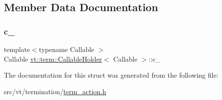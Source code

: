 \subsection{Member Data Documentation}
\mbox{\label{structvt_1_1term_1_1_callable_holder_a8b22db3730f6ed7853b0084b9499505f}} 
\subsubsection{\texorpdfstring{c\+\_\+}{c\_}}
{\footnotesize\ttfamily template$<$typename Callable $>$ \\
Callable \hyperlink{structvt_1_1term_1_1_callable_holder}{vt\+::term\+::\+Callable\+Holder}$<$ Callable $>$\+::c\+\_\+\hspace{0.3cm}{\ttfamily [private]}}



The documentation for this struct was generated from the following file\+:\begin{DoxyCompactItemize}
\item 
src/vt/termination/\hyperlink{term__action_8h}{term\+\_\+action.\+h}\end{DoxyCompactItemize}
